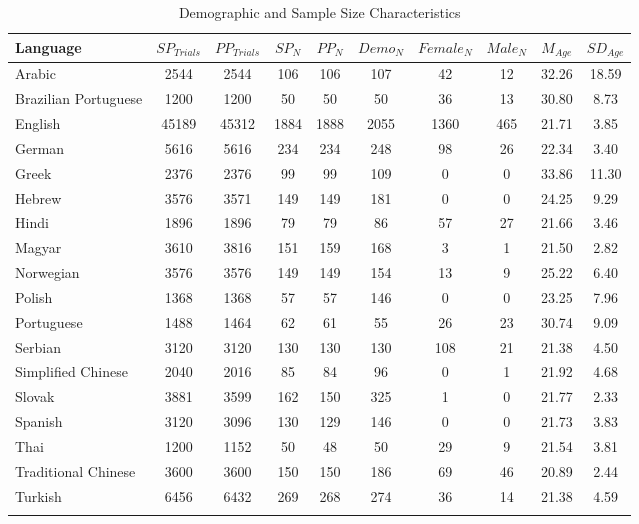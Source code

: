 \documentclass[
  man,floatsintext]{apa7}
\begin{document}
\begin{table}[tbp]

\begin{center}
\begin{threeparttable}

\caption{\label{tab:sample-table}Demographic and Sample Size Characteristics}

\footnotesize{

\begin{tabular}{lccccccccc}
\toprule
Language & $SP_{Trials}$ & $PP_{Trials}$ & $SP_N$ & $PP_N$ & $Demo_N$ & $Female_N$ & $Male_N$ & $M_{Age}$ & $SD_{Age}$\\
\midrule
Arabic & 2544 & 2544 & 106 & 106 & 107 & 42 & 12 & 32.26 & 18.59\\
Brazilian Portuguese & 1200 & 1200 & 50 & 50 & 50 & 36 & 13 & 30.80 & 8.73\\
English & 45189 & 45312 & 1884 & 1888 & 2055 & 1360 & 465 & 21.71 & 3.85\\
German & 5616 & 5616 & 234 & 234 & 248 & 98 & 26 & 22.34 & 3.40\\
Greek & 2376 & 2376 & 99 & 99 & 109 & 0 & 0 & 33.86 & 11.30\\
Hebrew & 3576 & 3571 & 149 & 149 & 181 & 0 & 0 & 24.25 & 9.29\\
Hindi & 1896 & 1896 & 79 & 79 & 86 & 57 & 27 & 21.66 & 3.46\\
Magyar & 3610 & 3816 & 151 & 159 & 168 & 3 & 1 & 21.50 & 2.82\\
Norwegian & 3576 & 3576 & 149 & 149 & 154 & 13 & 9 & 25.22 & 6.40\\
Polish & 1368 & 1368 & 57 & 57 & 146 & 0 & 0 & 23.25 & 7.96\\
Portuguese & 1488 & 1464 & 62 & 61 & 55 & 26 & 23 & 30.74 & 9.09\\
Serbian & 3120 & 3120 & 130 & 130 & 130 & 108 & 21 & 21.38 & 4.50\\
Simplified Chinese & 2040 & 2016 & 85 & 84 & 96 & 0 & 1 & 21.92 & 4.68\\
Slovak & 3881 & 3599 & 162 & 150 & 325 & 1 & 0 & 21.77 & 2.33\\
Spanish & 3120 & 3096 & 130 & 129 & 146 & 0 & 0 & 21.73 & 3.83\\
Thai & 1200 & 1152 & 50 & 48 & 50 & 29 & 9 & 21.54 & 3.81\\
Traditional Chinese & 3600 & 3600 & 150 & 150 & 186 & 69 & 46 & 20.89 & 2.44\\
Turkish & 6456 & 6432 & 269 & 268 & 274 & 36 & 14 & 21.38 & 4.59\\
\bottomrule
\addlinespace
\end{tabular}

}
\end{threeparttable}
\end{center}
\end{table}
\end{document}
